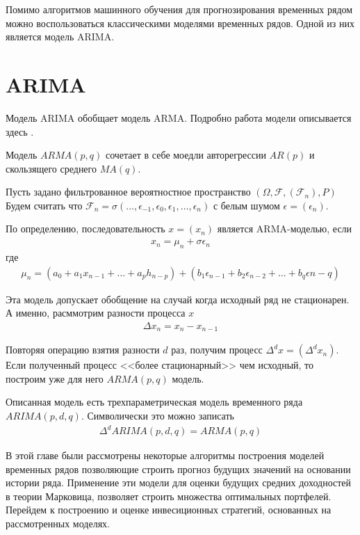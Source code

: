 Помимо алгоритмов машинного обучения для прогнозирования временных рядом можно воспользоваться классическими моделями временных рядов.
Одной из них является модель ARIMA.

\section{ARIMA}
\label{sec:ARIMA}

Модель ARIMA обобщает модель ARMA. Подробно работа модели описывается здесь \cite{shiryaev_finmat_1}.

Модель $ARMA(p, q)$ сочетает в себе моедли авторегрессии $AR(p)$ и скользящего среднего $MA(q)$.

Пусть задано фильтрованное вероятностное пространство $\left( \Omega, \mathscr{F}, (\mathscr{F}_n), P \right)$
Будем считать что $\mathscr{F}_n = \sigma(\dots, \epsilon_{-1}, \epsilon_0, \epsilon_1, \dots, \epsilon_n)$ с белым шумом $\epsilon = (\epsilon_n)$.

По определению, последовательность $x = (x_n)$ является ARMA-моделью, если 
\begin{align}
	x_n = \mu_n + \sigma \epsilon_n
\end{align}
где
\begin{align}
	\mu_n = \left(a_0 + a_1 x_{n-1} + \dots + a_p h_{n-p} \right) +
	\left(b_1 \epsilon_{n-1} + b_2 \epsilon_{n-2} + \dots + b_q \epsilon{n - q} \right)
\end{align}

Эта модель допускает обобщение на случай когда исходный ряд не стационарен. А именно, расммотрим разности процесса $x$
\begin{align}
	\Delta x_n = x_n - x_{n-1}
\end{align}

Повторяя операцию взятия разности $d$ раз, получим процесс $\Delta^d x = (\Delta^d x_n)$. Если полученный процесс <<более стационарный>>
чем исходный, то построим уже для него $ARMA(p, q)$ модель.

Описанная модель есть трехпараметрическая модель временного ряда $ARIMA(p, d, q)$. Символически это можно записать
\begin{align}
	\Delta^d ARIMA(p, d, q) = ARMA(p, q)
\end{align}

В этой главе были рассмотрены некоторые алгоритмы построения моделей временных рядов позволяющие строить прогноз будущих значений на основании
истории ряда. Применение эти модели для оценки будущих средних доходностей в теории Марковица, позволяет строить множества оптимальных портфелей.
Перейдем к построению и оценке инвесиционных стратегий, основанных на рассмотренных моделях.